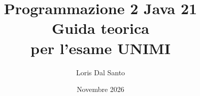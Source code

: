 \documentclass[12pt,a4paper]{article}
\begin{document}
\title{Programmazione 2 Java 21\\Guida teorica\\per l'esame UNIMI}
\author{Loris Dal Santo}
\date{Novembre 2026}
\maketitle

\tableofcontents
\newpage


\end{document}
